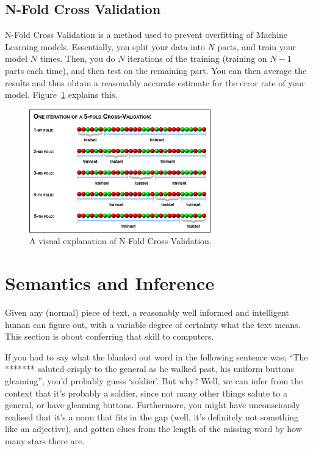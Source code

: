 \subsection{N-Fold Cross Validation}

N-Fold Cross Validation is a method used to prevent overfitting of Machine
Learning models. Essentially, you split your data into $N$ parts, and train your
model $N$ times. Then, you do $N$ iterations of the training (training on $N-1$
parts each time), and then test on the remaining part. You can then average the
results and thus obtain a reasonably accurate estimate for the error rate of
your model. Figure~\ref{fig:cross-validation} explains this.

\begin{figure}[h]
  \centering
  \includegraphics[width=0.7\textwidth]{images/cross-validation}
  \caption{A visual explanation of N-Fold Cross Validation.}
  \label{fig:cross-validation}
\end{figure}

\section{Semantics and Inference}

Given any (normal) piece of text, a reasonably well informed and intelligent
human can figure out, with a variable degree of certainty what the text means.
This section is about conferring that skill to computers.

If you had to say what the blanked out word in the following sentence was; ``The
******* saluted crisply to the general as he walked past, his uniform buttons
gleaming'', you'd probably guess `soldier'. But why? Well, we can infer from the
context that it's probably a soldier, since not many other things salute to a
general, or have gleaming buttons. Furthermore, you might have unconsciously
realised that it's a noun that fits in the gap (well, it's definitely not
something like an adjective), and gotten clues from the length of the missing
word by how many stars there are.

